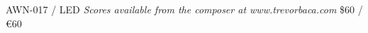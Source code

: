 \documentclass[11pt]{report}
\begin{document}
\null \vfill

AWN-017 / LED \hfill
\textit{Scores available from the composer at www.trevorbaca.com}
\hfill \$60 / \euro 60
\end{document}
